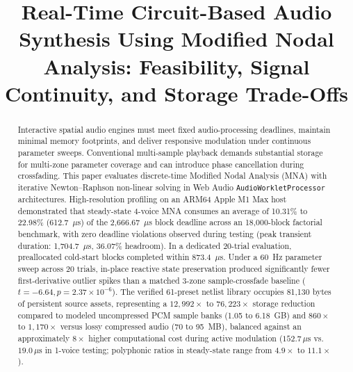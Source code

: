 \documentclass[fleqn,final]{jaes}
\begin{document}
\title{Real-Time Circuit-Based Audio Synthesis Using Modified Nodal Analysis: Feasibility, Signal Continuity, and Storage Trade-Offs}



\maketitle

\begin{abstract}
\noindent Interactive spatial audio engines must meet fixed audio-processing deadlines, maintain minimal memory footprints, and deliver responsive modulation under continuous parameter sweeps. Conventional multi-sample playback demands substantial storage for multi-zone parameter coverage and can introduce phase cancellation during crossfading. This paper evaluates discrete-time Modified Nodal Analysis (MNA) with iterative Newton--Raphson non-linear solving in Web Audio \texttt{AudioWorkletProcessor} architectures. High-resolution profiling on an ARM64 Apple M1 Max host demonstrated that steady-state 4-voice MNA consumes an average of 10.31\% to 22.98\% (612.7~$\mu$s) of the 2,666.67~$\mu$s block deadline across an 18,000-block factorial benchmark, with zero deadline violations observed during testing (peak transient duration: 1,704.7~$\mu$s, 36.07\% headroom). In a dedicated 20-trial evaluation, preallocated cold-start blocks completed within 873.4~$\mu$s. Under a 60~Hz parameter sweep across 20 trials, in-place reactive state preservation produced significantly fewer first-derivative outlier spikes than a matched 3-zone sample-crossfade baseline ($t = -6.64, p = 2.37 \times 10^{-6}$). The verified 61-preset netlist library occupies 81,130 bytes of persistent source assets, representing a $12,992\times$ to $76,223\times$ storage reduction compared to modeled uncompressed PCM sample banks (1.05 to 6.18~GB) and $860\times$ to $1,170\times$ versus lossy compressed audio (70 to 95~MB), balanced against an approximately $8\times$ higher computational cost during active modulation ($152.7\,\mu\text{s}$ vs. $19.0\,\mu\text{s}$ in 1-voice testing; polyphonic ratios in steady-state range from $4.9\times$ to $11.1\times$).
\end{abstract}
\end{document}
